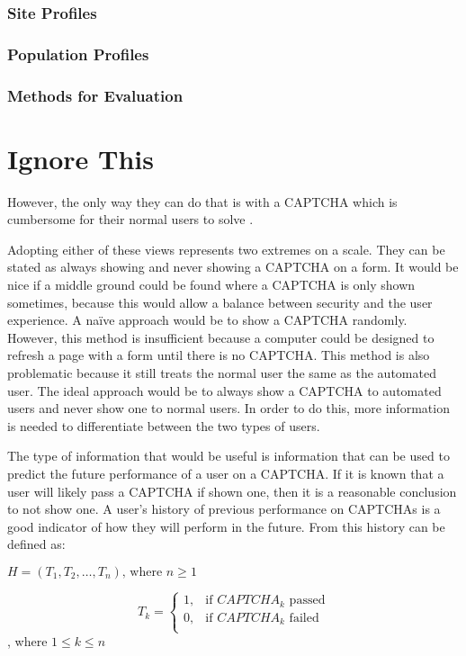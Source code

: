 \documentclass[journal, 12pt, onecolumn, draftclsnofoot]{IEEEtran}
\begin{document}
\subsubsection{Site Profiles}

\subsubsection{Population Profiles}

\subsubsection{Methods for Evaluation}

\section{Ignore This}


However, the only way they can do that is with a CAPTCHA which is cumbersome for their normal users to solve \cite{kluever, yan, benasher}.

Adopting either of these views represents two extremes on a scale. They can be stated as always showing and never showing a CAPTCHA on a form. It would be nice if a middle ground could be found where a CAPTCHA is only shown sometimes, because this would allow a balance between security and the user experience. A naïve approach would be to show a CAPTCHA randomly. However, this method is insufficient because a computer could be designed to refresh a page with a form until there is no CAPTCHA. This method is also problematic because it still treats the normal user the same as the automated user. The ideal approach would be to always show a CAPTCHA to automated users and never show one to normal users. In order to do this, more information is needed to differentiate between the two types of users.

The type of information that would be useful is information that can be used to predict the future performance of a user on a CAPTCHA. If it is known that a user will likely pass a CAPTCHA if shown one, then it is a reasonable conclusion to not show one. A user’s history of previous performance on CAPTCHAs is a good indicator of how they will perform in the future. From this history can be defined as:

$H = (T_1,T_2,\ldots,T_n )\text{, where }n \geq 1$

\[
T_k =
  \begin{cases}
    1, &\text{if $CAPTCHA_k$ passed}\\
    0, &\text{if $CAPTCHA_k$ failed}\\
  \end{cases}
\], where $1 \leq k \leq n$
\end{document}
